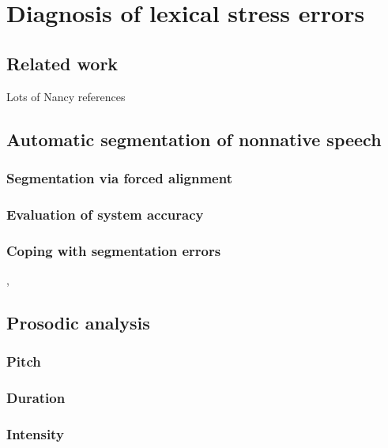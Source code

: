 %
%
\chapter{Diagnosis of lexical stress errors}
\label{chap:diagnosis}


\blindtext 

\section{Related work}

	Lots of Nancy references
	
	\cite{Duong2011}
	
	\cite{Probst2002}

\section{Automatic segmentation of nonnative speech}
	\subsection{Segmentation via forced alignment}
	\subsection{Evaluation of system accuracy}
	\subsection{Coping with segmentation errors}
		\cite{Mesbahi2011},
		\cite{Orosanu2012}
	
\section{Prosodic analysis}
	\subsection{Pitch}
	\subsection{Duration}
	\subsection{Intensity}
	
